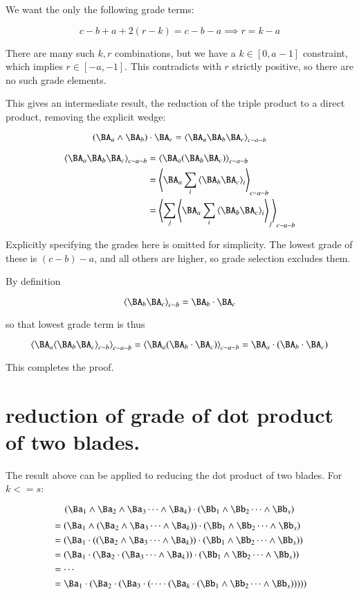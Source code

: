 We want the only the following grade terms:

\[
c-b+a+2(r-k) = c - b - a
\implies
r=k-a
\]

There are many such $k,r$ combinations, but we have a $k \in [0,a-1]$ constraint, which implies $r \in [-a,-1]$.  This contradicts with $r$ strictly
positive,
so there are no such grade elements.

This gives an intermediate result, the reduction of the triple product to a direct product, removing the explicit wedge:

\begin{equation}
(\BA_a \wedge \BA_b) \cdot \BA_c =
\gpgrade{\BA_a \BA_b \BA_c}{c-a-b}
\end{equation}

\begin{align*}
\gpgrade{\BA_a \BA_b \BA_c}{c-a-b}
&= \gpgrade{\BA_a (\BA_b \BA_c)}{c-a-b} \\
&= \gpgrade{\BA_a \sum_{i}\gpgrade{\BA_b \BA_c}{i}}{c-a-b} \\
&= \gpgrade{\sum_{j}\gpgrade{\BA_a \sum_{i}\gpgrade{\BA_b \BA_c}{i}}{j}}{c-a-b} \\
\end{align*}

Explicitly specifying the grades here is omitted for simplicity.  The lowest grade of these is $(c-b)-a$, and all others are higher, 
so grade selection excludes them.

By definition

\[
\gpgrade{\BA_b \BA_c}{c-b} = \BA_b \cdot \BA_c
\]

so that lowest grade term is thus

\[
\gpgrade{\BA_a \gpgrade{\BA_b \BA_c}{c-b}}{c-a-b}
= \gpgrade{\BA_a (\BA_b \cdot \BA_c)}{c-a-b}
= \BA_a \cdot (\BA_b \cdot \BA_c)
\]

This completes the proof.

\section{reduction of grade of dot product of two blades. }

The result above can be applied to reducing the dot product of two blades.  For $k<=s$:

\[
(\Ba_1 \wedge \Ba_2 \wedge \Ba_3 \cdots \wedge \Ba_k) \cdot (\Bb_1 \wedge \Bb_2 \cdots \wedge \Bb_s)
\]
\begin{align*}
&= (\Ba_1 \wedge (\Ba_2 \wedge \Ba_3 \cdots \wedge \Ba_k)) \cdot (\Bb_1 \wedge \Bb_2 \cdots \wedge \Bb_s) \\
&= (\Ba_1 \cdot ((\Ba_2 \wedge \Ba_3 \cdots \wedge \Ba_k)) \cdot (\Bb_1 \wedge \Bb_2 \cdots \wedge \Bb_s)) \\
&= (\Ba_1 \cdot (\Ba_2 \cdot (\Ba_3 \cdots \wedge \Ba_k)) \cdot (\Bb_1 \wedge \Bb_2 \cdots \wedge \Bb_s)) \\
&= \cdots \\
&= \Ba_1 \cdot (\Ba_2 \cdot (\Ba_3 \cdot (\cdots \cdot (\Ba_k \cdot (\Bb_1 \wedge \Bb_2 \cdots \wedge \Bb_s))))) \\
\end{align*}

